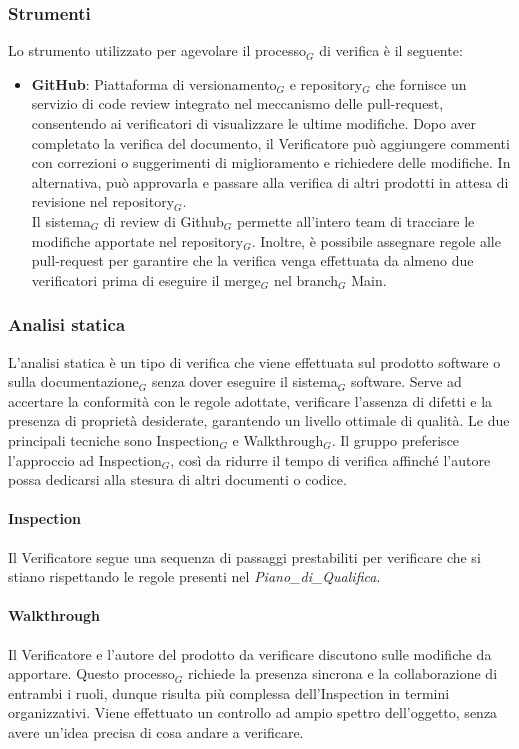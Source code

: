 \documentclass[10pt]{article}
\begin{document}
\begin{justify}
    \subsubsection{Strumenti}
    Lo strumento utilizzato per agevolare il processo$_G$ di verifica è il seguente:
    \begin{itemize}
        \item \textbf{GitHub}: Piattaforma di versionamento$_G$ e repository$_G$ che fornisce un servizio di code review integrato nel meccanismo delle pull-request, consentendo ai verificatori di visualizzare le ultime modifiche. Dopo aver completato la verifica del documento, il Verificatore può aggiungere commenti con correzioni o suggerimenti di miglioramento e richiedere delle modifiche. In alternativa, può approvarla e passare alla verifica di altri prodotti in attesa di revisione nel repository$_G$.\\
        Il sistema$_G$ di review di Github$_G$ permette all'intero team di tracciare le modifiche apportate nel repository$_G$. Inoltre, è possibile assegnare regole alle pull-request per garantire che la verifica venga effettuata da almeno due verificatori prima di eseguire il merge$_G$ nel branch$_G$ Main.
    \end{itemize}

    \subsubsection{Analisi statica}
    L'analisi statica è un tipo di verifica che viene effettuata sul prodotto software o sulla documentazione$_G$ senza dover eseguire il sistema$_G$ software. Serve ad accertare la conformità con le regole adottate, verificare l'assenza di difetti e la presenza di proprietà desiderate, garantendo un livello ottimale di qualità. Le due principali tecniche sono Inspection$_G$ e Walkthrough$_G$. Il gruppo preferisce l'approccio ad Inspection$_G$, così da ridurre il tempo di verifica affinché l'autore possa dedicarsi alla stesura di altri documenti o codice.
    
    \paragraph{Inspection}
    Il Verificatore segue una sequenza di passaggi prestabiliti per verificare che si stiano rispettando le regole presenti nel \textit{Piano\_di\_Qualifica}.
    
    \paragraph{Walkthrough}
    Il Verificatore e l'autore del prodotto da verificare discutono sulle modifiche da apportare. Questo processo$_G$ richiede la presenza sincrona e la collaborazione di entrambi i ruoli, dunque risulta più complessa dell'Inspection in termini organizzativi. Viene effettuato un controllo ad ampio spettro dell'oggetto, senza avere un'idea precisa di cosa andare a verificare.


\end{justify}
\end{document}
